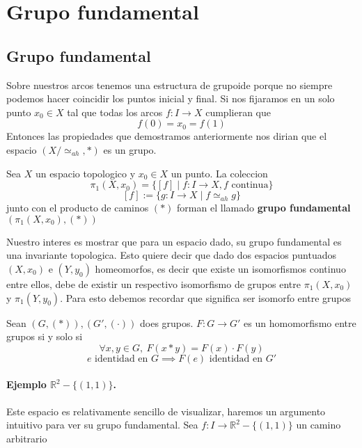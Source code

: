 \section{Grupo fundamental}




\subsection{Grupo fundamental}
Sobre nuestros arcos tenemos una estructura de grupoide porque no siempre
podemos hacer coincidir los puntos inicial y final. Si nos fijaramos en
un solo punto \(x_0 \in X\) tal que todas los arcos \(f : I \to X\)
cumplieran que
\[ f(0) = x_0 = f (1) \]
Entonces las propiedades que demostramos anteriormente nos dirian que el
espacio \((X / \simeq_{ah}, *)\) es un grupo.
\begin{definicion}
  Sea \(X\) un espacio topologico y \(x_0 \in X\) un punto. La coleccion
  \[ \pi_1 (X,x_0) = \{ [f] \mid f : I \to X, f \text{ continua}\}\]
  \[ [f] := \{ g : I \to X \mid f \simeq_{ah} g\}\]
  junto con el producto de caminos \((*)\) forman el llamado
  \textbf{grupo fundamental} \((\pi_1(X,x_0), (*))\)
\end{definicion}
Nuestro interes es mostrar que para un espacio dado, su grupo fundamental
es una invariante topologica. Esto quiere decir que dado dos espacios puntuados
\((X,x_0)\) e \((Y,y_0)\) homeomorfos, es decir que existe un isomorfismos continuo
entre ellos, debe de existir un respectivo isomorfismo de grupos entre
\(\pi_1(X,x_0)\) y \(\pi_1(Y,y_0)\). Para esto debemos recordar que
significa ser isomorfo entre grupos
\begin{definicion}
  Sean \((G,(*)), (G', (\cdot))\) does grupos. \(F : G \to G'\) es un
  homomorfismo entre grupos si y solo si
  \[ \forall x,y \in G,\ F (x * y) = F(x) \cdot F(y)\]
  \[ e \text{ identidad en } G \implies F(e) \text { identidad en } G' \]
\end{definicion}

\paragraph{Ejemplo \(\mathbb{R}^2 - \{(1,1)\}\).} Este espacio es
relativamente sencillo de visualizar, haremos un argumento intuitivo para
ver su grupo fundamental. Sea \(f : I \to \mathbb{R}^2 - \{(1,1)\}\) un
camino arbitrario

